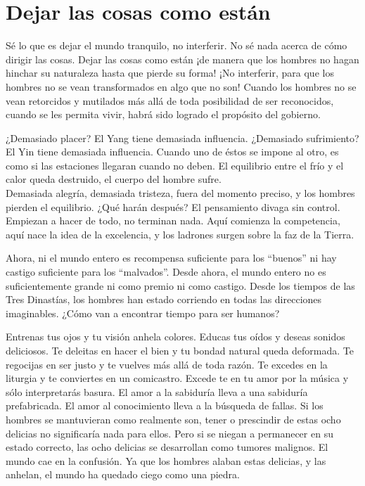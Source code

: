 \documentclass[hidelinks]{memoir}
\begin{document}
	\chapter*{Dejar las cosas como están}
	
	Sé lo que es dejar el mundo tranquilo, no interferir. No sé nada acerca
	de cómo dirigir las cosas. Dejar las cosas como están ¡de manera que los
	hombres no hagan hinchar su naturaleza hasta que pierde su forma! ¡No
	interferir, para que los hombres no se vean transformados en algo que no
	son! Cuando los hombres no se vean retorcidos y mutilados más allá de
	toda posibilidad de ser reconocidos, cuando se les permita vivir, habrá
	sido logrado el propósito del gobierno.
	
	¿Demasiado placer? El Yang tiene demasiada influencia. ¿Demasiado
	sufrimiento? El Yin tiene demasiada influencia. Cuando uno de éstos se
	impone al otro, es como si las estaciones llegaran cuando no deben. El
	equilibrio entre el frío y el calor queda destruido, el cuerpo del
	hombre sufre.\\
	Demasiada alegría, demasiada tristeza, fuera del momento preciso, y los
	hombres pierden el equilibrio. ¿Qué harán después? El pensamiento divaga
	sin control. Empiezan a hacer de todo, no terminan nada. Aquí comienza
	la competencia, aquí nace la idea de la excelencia, y los ladrones
	surgen sobre la faz de la Tierra.
	
	Ahora, ni el mundo entero es recompensa suficiente para los ``buenos''
	ni hay castigo suficiente para los ``malvados''. Desde ahora, el mundo
	entero no es suficientemente grande ni como premio ni como castigo.
	Desde los tiempos de las Tres Dinastías, los hombres han estado
	corriendo en todas las direcciones imaginables. ¿Cómo van a encontrar
	tiempo para ser humanos?
	
	Entrenas tus ojos y tu visión anhela colores. Educas tus oídos y deseas
	sonidos deliciosos. Te deleitas en hacer el bien y tu bondad natural
	queda deformada. Te regocijas en ser justo y te vuelves más allá de toda
	razón. Te excedes en la liturgia y te conviertes en un comicastro.
	Excede te en tu amor por la música y sólo interpretarás basura. El amor
	a la sabiduría lleva a una sabiduría prefabricada. El amor al
	conocimiento lleva a la búsqueda de fallas. Si los hombres se
	mantuvieran como realmente son, tener o prescindir de estas ocho
	delicias no significaría nada para ellos. Pero si se niegan a permanecer
	en su estado correcto, las ocho delicias se desarrollan como tumores
	malignos. El mundo cae en la confusión. Ya que los hombres alaban estas
	delicias, y las anhelan, el mundo ha quedado ciego como una piedra.
	
\end{document}
